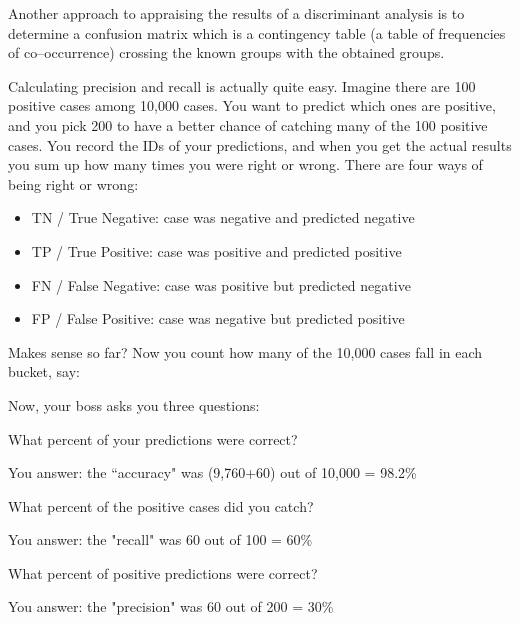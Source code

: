 \documentclass[12pt]{article} %
\begin{document}
Another approach to appraising the results of a discriminant analysis is to determine a confusion matrix which is a contingency table (a table of frequencies of co–occurrence) crossing the known groups with the obtained groups.





Calculating precision and recall is actually quite easy. Imagine there are 100 positive cases among 10,000 cases. You want to predict which ones are positive, and you pick 200 to have a better chance of catching many of the 100 positive cases.  You record the IDs of your predictions, and when you get the actual results you sum up how many times you were right or wrong. There are four ways of being right or wrong:

\begin{itemize}
\item TN / True Negative: case was negative and predicted negative
\item TP / True Positive: case was positive and predicted positive
\item FN / False Negative: case was positive but predicted negative
\item FP / False Positive: case was negative but predicted positive
\end{itemize}

Makes sense so far? Now you count how many of the 10,000 cases fall in each bucket, say:


Now, your boss asks you three questions:

What percent of your predictions were correct? 

You answer: the ``accuracy" was (9,760+60) out of 10,000 = 98.2\%

What percent of the positive cases did you catch? 

You answer: the "recall" was 60 out of 100 = 60\%

What percent of positive predictions were correct? 

You answer: the "precision" was 60 out of 200 = 30\%
\end{document}
